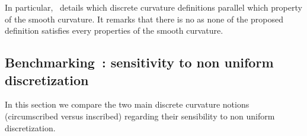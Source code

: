 In particular,~\cite{Vouga2014} details which discrete curvature definitions parallel which property of the smooth curvature. It remarks that there is no  as none of the proposed definition satisfies every properties of the smooth curvature.

%







\subsection{Benchmarking~: sensitivity to non uniform discretization}
In this section we compare the two main discrete curvature notions (circumscribed versus inscribed) regarding their sensibility to non uniform discretization.

